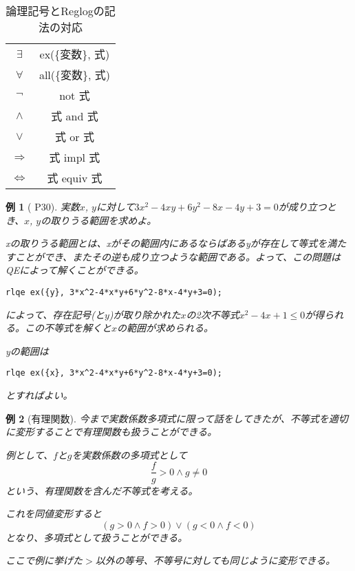 \documentclass[a4j,12pt]{jarticle}
\theoremstyle{break}
\newtheorem{Example}{例}[section]
\begin{document}
\begin{table}[h]
\begin{center}
\caption{論理記号とReglogの記法の対応}
\begin{tabular}{|c|c|}
\hline
$\exists$ & ex(\{変数\}, 式) \\
$\forall$ & all(\{変数\}, 式) \\
$\lnot$ & not 式 \\
$\wedge$ & 式 and 式 \\
$\vee$ & 式 or 式 \\
$\Rightarrow$ & 式 impl 式 \\
$\Leftrightarrow$ & 式 equiv 式 \\
\hline
\end{tabular}
\end{center}
\end{table}

\begin{Example}[\cite{QEの計算アルゴリズムとその応用} P30]
実数$x$, $y$に対して$3x^2 - 4xy + 6y^2 - 8x - 4y + 3 = 0$が成り立つとき、$x$, $y$の取りうる範囲を求めよ。

xの取りうる範囲とは、xがその範囲内にあるならばあるyが存在して等式を満たすことができ、またその逆も成り立つような範囲である。よって、この問題はQEによって解くことができる。
\begin{framed}
\begin{verbatim}
rlqe ex({y}, 3*x^2-4*x*y+6*y^2-8*x-4*y+3=0);
\end{verbatim}
\end{framed}
によって、存在記号(と$y$)が取り除かれた$x$の2次不等式$x^2-4x+1 \le 0$が得られる。この不等式を解くと$x$の範囲が求められる。

yの範囲は
\begin{framed}
\begin{verbatim}
rlqe ex({x}, 3*x^2-4*x*y+6*y^2-8*x-4*y+3=0);
\end{verbatim}
\end{framed}
とすればよい。
\end{Example}

\begin{Example}[有理関数]
今まで実数係数多項式に限って話をしてきたが、不等式を適切に変形することで有理関数も扱うことができる。

例として、$f$と$g$を実数係数の多項式として
\[ \frac{f}{g} > 0 \wedge g \ne 0 \]
という、有理関数を含んだ不等式を考える。

これを同値変形すると
\[ (g > 0 \wedge f > 0) \vee (g < 0 \wedge f < 0)\]
となり、多項式として扱うことができる。

ここで例に挙げた$>$以外の等号、不等号に対しても同じように変形できる。
\end{Example}
\end{document}
